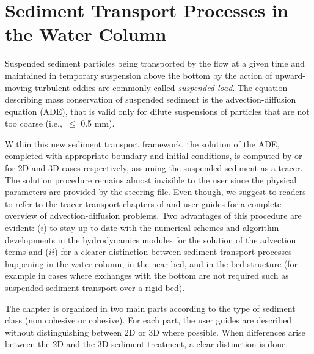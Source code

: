 \chapter[Sediment Transport Processes in the Water Column]{Sediment Transport Processes in the Water Column}
\label{chap:SuspendedSedimentTransport}

Suspended sediment particles being transported by the flow at a given time and maintained in temporary suspension above the bottom by the action of upward-moving turbulent eddies are commonly called \textit{suspended load}. The equation describing mass conservation of suspended sediment is the advection-diffusion equation (ADE), that is valid only for dilute suspensions of particles that are not too coarse (i.e.,~$\leq$ 0.5 mm).

Within this new sediment transport framework, the solution of the ADE, completed with appropriate boundary and initial conditions, is computed by  or  for 2D and 3D cases respectively, assuming the suspended sediment as a tracer. The solution procedure remains almost invisible to the user since the physical parameters are provided by the \gaia{} steering file. Even though, we suggest to readers to refer to the tracer transport chapters of  and  user guides for a complete overview of advection-diffusion problems. Two advantages of this procedure are evident: ($i$) to stay up-to-date with the numerical schemes and algorithm developments in the hydrodynamics modules for the solution of the advection terms and ($ii$) for a clearer distinction between sediment transport processes happening in the water column, in the near-bed, and in the bed structure (for example in cases where exchanges with the bottom are not required such as suspended sediment transport over a rigid bed).

The chapter is organized in two main parts according to the type of sediment class (non cohesive or cohesive). For each part, the user guides are described without distinguishing between 2D or 3D where possible. When differences arise between the 2D and the 3D sediment treatment, a clear distinction is done.
